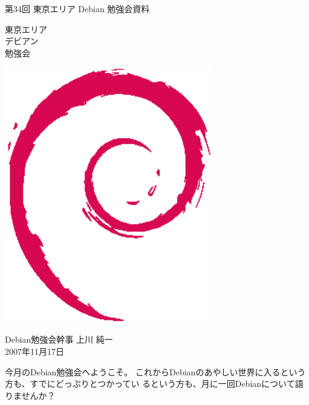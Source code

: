 \documentclass[mingoth,a4paper]{jsarticle}
\newcommand{\debmtgyear}{2007}
\newcommand{\debmtgdate}{17}
\newcommand{\debmtgmonth}{11}
\newcommand{\debmtgnumber}{34}
\begin{document}
\begin{titlepage}


 第\debmtgnumber{}回 東京エリア Debian 勉強会資料

\vspace{2cm}

\begin{minipage}[t]{0.6\hsize}
\vspace{-2cm}
{\fontsize{60}{60}
{\gt
\color{dancerdarkblue}
東京エリア \\
デビアン \\
勉強会
}}
\end{minipage}
\begin{minipage}[b]{0.4\hsize}
\hspace{-1cm}\includegraphics[width=9cm]{image200502/openlogo-nd.eps}
\end{minipage}

\vspace{3cm}
\hfill{}Debian勉強会幹事 上川 純一\\
\hfill{}\debmtgyear{}年\debmtgmonth{}月\debmtgdate{}日

\thispagestyle{empty}
\end{titlepage}



今月のDebian勉強会へようこそ。
 これからDebianのあやしい世界に入るという方も、すでにどっぷりとつかってい
 るという方も、月に一回Debianについて語りませんか？
\end{document}
